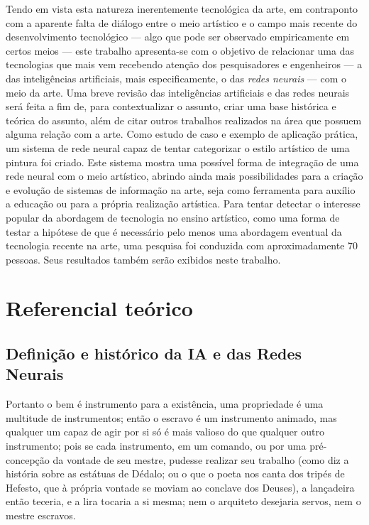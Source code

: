 \documentclass[12pt, a4paper]{article}
\begin{document}
Tendo em vista esta natureza inerentemente tecnológica da arte, em contraponto com a aparente falta de diálogo entre o meio artístico e o campo
mais recente do desenvolvimento tecnológico --- algo que pode ser observado empiricamente em certos meios --- este trabalho apresenta-se com o objetivo
de relacionar uma das tecnologias que mais vem recebendo atenção dos pesquisadores e engenheiros --- a das inteligências artificiais, mais especificamente,
o das \emph{redes neurais} --- com o meio da arte. 
Uma breve revisão das inteligências artificiais e das redes neurais será feita a fim de, para contextualizar o assunto, criar uma base 
histórica e teórica do assunto, além de citar outros trabalhos realizados na área que possuem alguma relação com a arte.
Como estudo de caso e exemplo de aplicação prática, um sistema de rede neural capaz de tentar categorizar o estilo artístico
de uma pintura foi criado. Este sistema mostra uma possível forma de integração de uma rede neural com o meio artístico, 
abrindo ainda mais possibilidades para a criação e evolução de sistemas de informação na arte, seja como ferramenta para auxílio a educação ou para a própria realização artística. 
Para tentar detectar o interesse popular da abordagem de tecnologia no ensino artístico, como uma forma de testar a hipótese de
que é necessário pelo menos uma abordagem eventual da tecnologia recente na arte, uma pesquisa foi conduzida com aproximadamente 70 pessoas. Seus resultados
também serão exibidos neste trabalho.

\section{Referencial teórico}
\subsection{Definição e histórico da IA e das Redes Neurais}
\begin{displayquote}
Portanto o bem é instrumento para a existência, uma propriedade é uma multitude de instrumentos; então o escravo é um instrumento animado,
mas qualquer um capaz de agir por si só é mais valioso do que qualquer outro instrumento; pois se cada instrumento, em um comando,
ou por uma pré-concepção da vontade de seu mestre, pudesse realizar seu trabalho (como diz a história sobre as estátuas de Dédalo; ou o que
o poeta nos canta dos tripés de Hefesto, que à própria vontade se moviam ao conclave dos Deuses), a lançadeira então teceria, e a lira
tocaria a si mesma; nem o arquiteto desejaria servos, nem o mestre escravos. \cite{aristotle_politics}
\end{displayquote}
\end{document}
